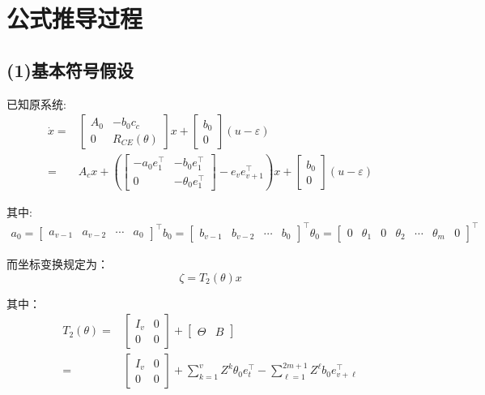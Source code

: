 \documentclass[a4paper,12pt]{article}
\begin{document}
\section*{公式推导过程}
\subsection*{(1)基本符号假设}
已知原系统:
\begin{align*}
    \dot{x} = &
    \begin{bmatrix}
        A_0 & -b_0c_c \\
        0 & R_{CE}(\theta)
    \end{bmatrix} x + 
    \begin{bmatrix}
        b_0 \\ 0
    \end{bmatrix} (u-\varepsilon)
    \\ = &
    A_c x + 
    \left(
        \left[
        \begin{array}{c|c}
        -a_0e_1^\top & -b_0e_1^\top\\ \hline
        0 & -\theta_0e_1^\top 
        \end{array}
        \right]
        - e_ve_{v+1}^\top
    \right)
     x + 
    \begin{bmatrix}
        b_0 \\ 0
    \end{bmatrix} (u-\varepsilon)
\end{align*}

其中:
\begin{align*}
    a_0 = 
    \begin{bmatrix}
        a_{v-1} & a_{v-2} & \cdots & a_0    
    \end{bmatrix}^\top
    b_0 = 
    \begin{bmatrix}
        b_{v-1} & b_{v-2} & \cdots & b_0    
    \end{bmatrix}^\top
    \theta_0 = 
    \begin{bmatrix}
        0 & \theta_{1} & 0 & \theta_{2} & \cdots & \theta_m & 0    
    \end{bmatrix}^\top
\end{align*}

而坐标变换规定为：
\[
    \zeta = T_2(\theta) x
\]

其中：
\begin{align*}
    T_2(\theta) = &
    \begin{bmatrix}
        I_{v} & 0 \\
        0 & 0
    \end{bmatrix} + 
    \left[
    \begin{array}{c|c}
    \Theta & B
    \end{array}
    \right]
    \\ = &
    \begin{bmatrix}
        I_{v} & 0 \\ 
        0 & 0
    \end{bmatrix}
    + \sum_{k=1}^{v} Z^k \theta_0 e_t^\top
    - \sum_{\ell=1}^{2m+1} Z^{\ell} b_0 e_{v+\ell}^\top
\end{align*}
\end{document}
